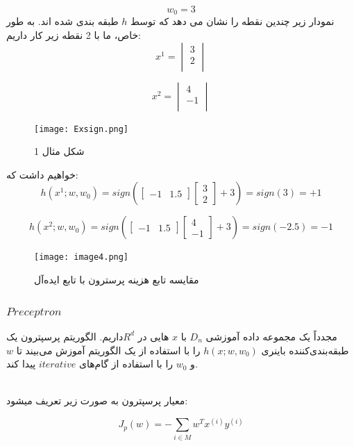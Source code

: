 \documentclass[12pt]{article}
\begin{document}
\[
w_0=3
\]
نمودار زیر چندین نقطه را نشان می دهد که توسط $h$ طبقه بندی شده اند. به طور خاص، ما با 2 نقطه زیر کار داریم:
\[
x^1 =\begin{vmatrix}
3 \\
2 \\
\end{vmatrix}
\]

\[
x^2 =\begin{vmatrix}
4 \\
-1 \\
\end{vmatrix}
\]

\begin{figure}[h]
    \centering
    \texttt{[image: Exsign.png]}
    \caption{شکل مثال 1}
\label{fig:f1}
\end{figure}

خواهیم داشت که:
\[
h(x^1; w,w_0) = sign \left( \begin{bmatrix} -1 & 1.5\end{bmatrix} \begin{bmatrix} 3 \\ 2\end{bmatrix}+ 3 \right)  = sign(3) = +1
\]

\[
h(x^2; w,w_0) = sign \left( \begin{bmatrix} -1 & 1.5\end{bmatrix} \begin{bmatrix} 4 \\ -1\end{bmatrix}+ 3 \right)  = sign(-2.5) = -1
\]

\begin{figure}[h]
    \centering
    \texttt{[image: image4.png]}
    \caption{مقایسه تابع هزینه پرسترون با تابع ایده‌آل}
    \label{fig:}
\end{figure}

\subsubsection{$Preceptron$}

مجدداً یک مجموعه داده آموزشی $D_n$ با $x$ هایی در $R^d$داریم. الگوریتم پرسپترون یک طبقه‌بندی‌کننده باینری $h(x; w, w_0)$ را با استفاده از یک الگوریتم آموزش می‌بیند تا $w$ و $w_0$ را با استفاده از گام‌های $iterative$ پیدا کند.

\\ 
معيار پرسپترون به صورت زير تعريف ميشود:

\[ J_p(w) = - \sum_{i \in M} w^T x^{(i)} y^{(i)} \]
\end{document}
